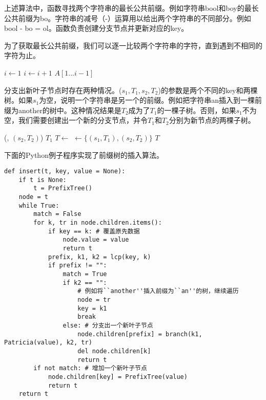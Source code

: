 \documentclass[UTF8]{article}
\begin{document}
上述算法中，函数寻找两个字符串的最长公共前缀。例如字符串bool和boy的最长公共前缀为bo。字符串的减号（-）运算用以给出两个字符串的不同部分。例如bool - bo = ol。函数负责创建分支节点并更新对应的key。

为了获取最长公共前缀，我们可以逐一比较两个字符串的字符，直到遇到不相同的字符为止。

\begin{algorithmic}[1]
  \State $i \gets 1 $
    \State $i \gets i + 1$
  \EndWhile
  \State \Return $A[1...i-1]$
\EndFunction
\end{algorithmic}

分支出新叶子节点时存在两种情况。($s_1, T_1, s_2, T_2$)的参数是两个不同的key和两棵树。如果$s_1$为空，说明一个字符串是另一个的前缀。例如把字符串an插入到一棵前缀为another的树中。这种情况结果是$T_2$成为了$T_1$的一棵子树。否则，如果$s_1$不为空，我们需要创建出一个新的分支节点，并令$T_1$和$T_2$分别为新节点的两棵子树。

\begin{algorithmic}[1]
    \State {}(, $(s_2, T_2)$)
    \State \Return $T_1$
  \EndIf
  \State $T \gets$ 
  \State {} $\gets \{(s_1, T_1), (s_2, T_2)\}$
  \State \Return $T$
\EndFunction
\end{algorithmic}

下面的Python例子程序实现了前缀树的插入算法。

\lstset{language=Python}
\begin{lstlisting}
def insert(t, key, value = None):
    if t is None:
        t = PrefixTree()
    node = t
    while True:
        match = False
        for k, tr in node.children.items():
            if key == k: # 覆盖原先数据
                node.value = value
                return t
            prefix, k1, k2 = lcp(key, k)
            if prefix != "":
                match = True
                if k2 == "":
                    # 例如将``another''插入前缀为``an''的树，继续遍历
                    node = tr
                    key = k1
                    break
                else: # 分支出一个新叶子节点
                    node.children[prefix] = branch(k1, Patricia(value), k2, tr)
                    del node.children[k]
                    return t
        if not match: # 增加一个新叶子节点
            node.children[key] = PrefixTree(value)
            return t
    return t
\end{lstlisting}
\end{document}

